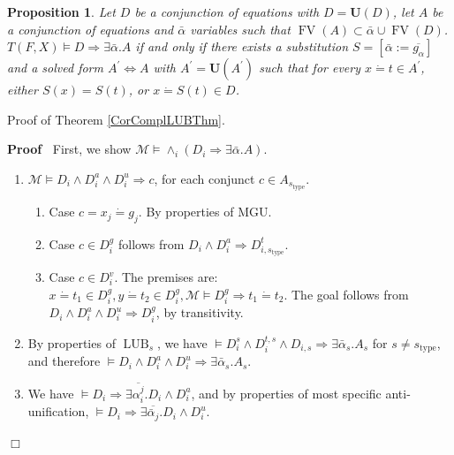 \documentclass{article}
\newcommand{\assign}{:=}
\newcommand{\tmmathbf}[1]{\ensuremath{\boldsymbol{#1}}}
\newcommand{\tmop}[1]{\ensuremath{\operatorname{#1}}}
\newenvironment{proof}{\noindent\textbf{Proof\ }}{\hspace*{\fill}$\Box$\medskip}
\newtheorem{proposition}{Proposition}
\begin{document}
\begin{proposition}
  \label{ImplSubst}Let $D$ be a conjunction of equations with $D =\tmmathbf{U}
  (D)$, let $A$ be a conjunction of equations and $\bar{\alpha}$ variables
  such that $\tmop{FV} (A) \subset \bar{\alpha} \cup \tmop{FV} (D)$. $T (F, X)
  \vDash D \Rightarrow \exists \bar{\alpha} .A$ if and only if there exists a
  substitution $S = [\bar{\alpha} \assign \overline{g_{\alpha}}]$ and a solved
  form $A^{\prime} \Leftrightarrow A$ with $A^{\prime} =\tmmathbf{U}
  (A^{\prime})$ such that for every $x \dot{=} t \in A^{\prime}$, either $S
  (x) = S (t)$, or $x \dot{=} S (t) \in D$.
\end{proposition}

Proof of Theorem \ref{CorComplLUBThm}.

\begin{proof}
  First, we show $\mathcal{M} \vDash \wedge_i (D_i \Rightarrow \exists
  \bar{\alpha} .A)$.
  \begin{enumerate}
    \item $\mathcal{M} \vDash D_i \wedge D_i^a \wedge D_i^u \Rightarrow c$,
    for each conjunct $c \in A_{s_{\tmop{type}}}$.
    \begin{enumerate}
      \item Case $c = x_j \dot{=} g_j$. By properties of MGU.
      
      \item Case $c \in D_i^g$ follows from $D_i \wedge D_i^a \Rightarrow
      D_{i, s_{\tmop{type}}}^t$.
      
      \item Case $c \in D_i^v$. The premises are: $x \dot{=} t_1 \in D_i^g, y
      \dot{=} t_2 \in D_i^g, \mathcal{M} \vDash D_i^g \Rightarrow t_1 \dot{=}
      t_2$. The goal follows from $D_i \wedge D_i^a \wedge D_i^u \Rightarrow
      D_i^g$, by transitivity. 
    \end{enumerate}
    \item By properties of $\tmop{LUB}_s$, we have $\vDash D_i^s \wedge
    D_i^{t, s} \wedge D_{i, s} \Rightarrow \exists \bar{\alpha}_s .A_s$ for $s
    \neq s_{\tmop{type}}$, and therefore $\vDash D_i \wedge D_i^a \wedge D_i^u
    \Rightarrow \exists \bar{\alpha}_s .A_s$.
    
    \item We have $\vDash D_i \Rightarrow \exists \overline{\alpha^j_i} .D_i
    \wedge D_i^a$, and by properties of most specific anti-unification,
    $\vDash D_i \Rightarrow \exists \overline{\bar{\alpha}_j} .D_i \wedge
    D_i^u$.
    

\end{enumerate}
\end{proof}
\end{document}
